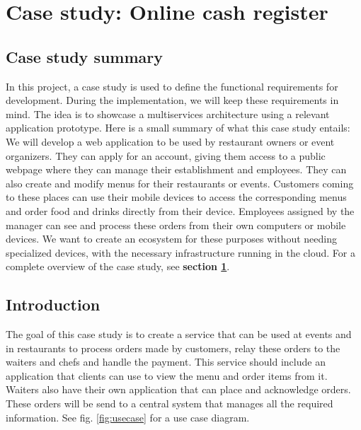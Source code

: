 \documentclass[12pt]{article}
\begin{document}
\section{Case study: Online cash register}\label{sec:casestudy}
\begin{multicols}{2}
\subsection{Case study summary}
In this project, a case study is used to define the functional requirements for development. During the implementation, we will keep these requirements in mind. The idea is to showcase a multiservices architecture using a relevant application prototype. Here is a small summary of what this case study entails: We will develop a web application to be used by restaurant owners or event organizers. They can apply for an account, giving them access to a public webpage where they can manage their establishment and employees. They can also create and modify menus for their restaurants or events. Customers coming to these places can use their mobile devices to access the corresponding menus and order food and drinks directly from their device. Employees assigned by the manager can see and process these orders from their own computers or mobile devices. We want to create an ecosystem for these purposes without needing specialized devices, with the necessary infrastructure running in the cloud. For a complete overview of the case study, see \textbf{section \ref{sec:casestudy}}.
\subsection{Introduction}
The goal of this case study is to create a service that can be used at events and in restaurants to process orders made by customers, relay these orders to the waiters and chefs and handle the payment. This service should include an application that clients can use to view the menu and order items from it. Waiters also have their own application that can place and acknowledge orders. These orders will be send to a central system that manages all the required information. See fig. \ref{fig:usecase} for a use case diagram.

\end{multicols}
\end{document}
